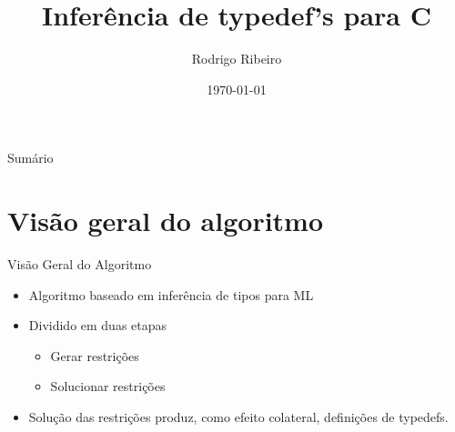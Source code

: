 \documentclass{beamer}
\title{Inferência de typedef's para C}
\author[Rodrigo Ribeiro]{Rodrigo Ribeiro}
\date{\today}
\begin{document}
   \begin{frame}
        \titlepage
   \end{frame}
   \begin{frame}{Sumário}
        \tableofcontents
   \end{frame}
   \section{Visão geral do algoritmo}
   \begin{frame}{Visão Geral do Algoritmo}
        \begin{itemize}
            \item Algoritmo baseado em inferência de tipos para ML
            \item Dividido em duas etapas
              \begin{itemize}
                  \item Gerar restrições
                  \item Solucionar restrições
             \end{itemize}
           \item Solução das restrições produz, como efeito colateral, definições de
             typedefs.
        \end{itemize}
    \end{frame}
\end{document}
